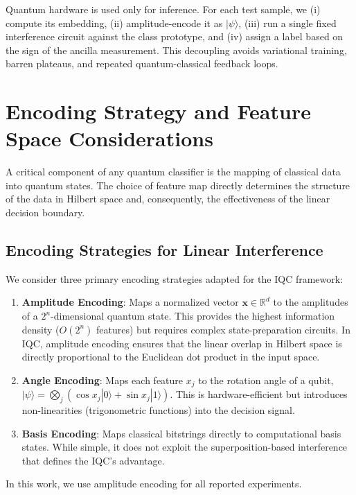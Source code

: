 \documentclass[conference]{IEEEtran}
\begin{document}
Quantum hardware is used only for inference. For each test sample, we (i) compute its embedding, (ii) amplitude-encode it as $|\psi\rangle$, (iii) run a single fixed interference circuit against the class prototype, and (iv) assign a label based on the sign of the ancilla measurement. This decoupling avoids variational training, barren plateaus, and repeated quantum-classical feedback loops.


\section{Encoding Strategy and Feature Space Considerations}

A critical component of any quantum classifier is the mapping of classical data into quantum states. The choice of feature map directly determines the structure of the data in Hilbert space and, consequently, the effectiveness of the linear decision boundary.

\subsection{Encoding Strategies for Linear Interference}

We consider three primary encoding strategies adapted for the IQC framework:
\begin{enumerate}
    \item \textbf{Amplitude Encoding}: Maps a normalized vector $\mathbf{x} \in \mathbb{R}^d$ to the amplitudes of a $2^n$-dimensional quantum state. This provides the highest information density ($O(2^n)$ features) but requires complex state-preparation circuits. In IQC, amplitude encoding ensures that the linear overlap in Hilbert space is directly proportional to the Euclidean dot product in the input space.
    \item \textbf{Angle Encoding}: Maps each feature $x_j$ to the rotation angle of a qubit, $|\psi\rangle = \bigotimes_j ( \cos x_j |0\rangle + \sin x_j |1\rangle)$. This is hardware-efficient but introduces non-linearities (trigonometric functions) into the decision signal.
    \item \textbf{Basis Encoding}: Maps classical bitstrings directly to computational basis states. While simple, it does not exploit the superposition-based interference that defines the IQC's advantage.
\end{enumerate}
In this work, we use amplitude encoding for all reported experiments.
\end{document}
